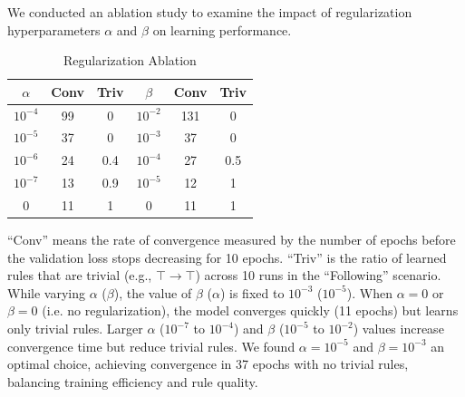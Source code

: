 We conducted an ablation study to examine the impact of regularization hyperparameters $\alpha$ and $\beta$ on learning performance.
\begin{table}
    \centering
    \begin{threeparttable}
        \caption{Regularization Ablation}\label{tab:ablation-on-regularization}
        \centering
        \scriptsize
        \begin{tabular}{@{}ccc|ccc@{}}\toprule
            $\alpha$  & Conv & Triv & $\beta$   & Conv & Triv \\\midrule
            $10^{-4}$ & 99   & 0    & $10^{-2}$ & 131  & 0    \\
            $10^{-5}$ & 37   & 0    & $10^{-3}$ & 37   & 0    \\
            $10^{-6}$ & 24   & 0.4  & $10^{-4}$ & 27   & 0.5  \\
            $10^{-7}$ & 13   & 0.9  & $10^{-5}$ & 12   & 1    \\
            0         & 11   & 1    & 0         & 11   & 1    \\
            \bottomrule
        \end{tabular}
    \end{threeparttable}
\end{table}
``Conv'' means the rate of convergence measured by the number of epochs before the validation loss stops decreasing for 10 epochs. ``Triv'' is the ratio of learned rules that are trivial (e.g., $\top \rightarrow \top$) across 10 runs in the ``Following'' scenario.
While varying $\alpha$ ($\beta$), the value of $\beta$ ($\alpha$) is fixed to $10^{-3}$ ($10^{-5}$).
When $\alpha = 0$ or $\beta = 0$ (i.e. no regularization), the model converges quickly (11 epochs) but learns only trivial rules.
Larger $\alpha$ ($10^{-7}$ to $10^{-4}$) and $\beta$ ($10^{-5}$ to $10^{-2}$) values increase convergence time but reduce trivial rules. We found $\alpha = 10^{-5}$ and $\beta = 10^{-3}$ an optimal choice, achieving convergence in 37 epochs with no trivial rules, balancing training efficiency and rule quality.

